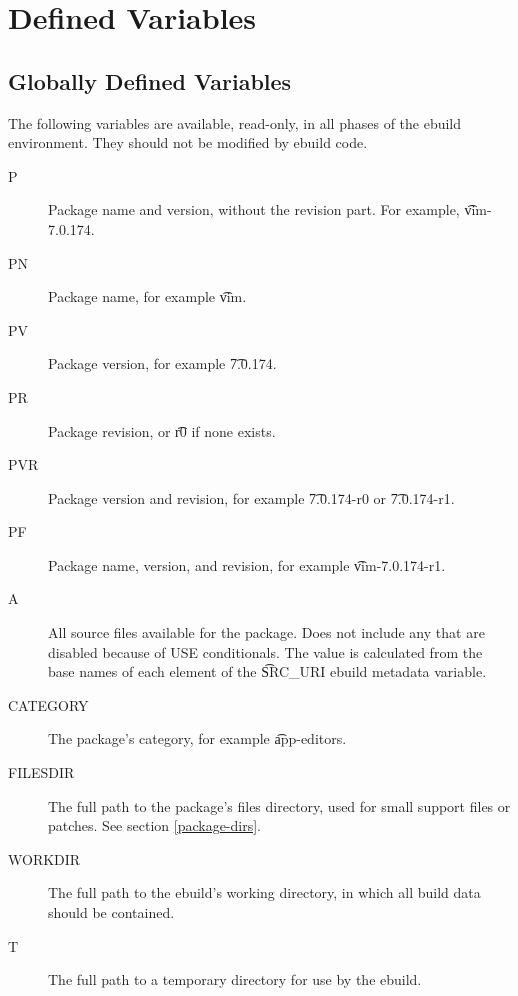 \section{Defined Variables}
\label{ebuild-env-vars}

\subsection{Globally Defined Variables}

The following variables are available, read-only, in all phases of the ebuild environment. They
should not be modified by ebuild code.
\begin{description}
\item[P] Package name and version, without the revision part. For example, \t{vim-7.0.174}.
\item[PN] Package name, for example \t{vim}.
\item[PV] Package version, for example \t{7.0.174}.
\item[PR] Package revision, or \t{r0} if none exists.
\item[PVR] Package version and revision, for example \t{7.0.174-r0} or \t{7.0.174-r1}.
\item[PF] Package name, version, and revision, for example \t{vim-7.0.174-r1}.
\item[A] All source files available for the package. Does not include any that are disabled because
    of USE conditionals. The value is calculated from the base names of each element of the
    \t{SRC\_URI} ebuild metadata variable.
\item[CATEGORY] The package's category, for example \t{app-editors}.
\item[FILESDIR] The full path to the package's files directory, used for small support files or
    patches. See section \ref{package-dirs}.
\item[WORKDIR] The full path to the ebuild's working directory, in which all build data should be
    contained.
\item[T] The full path to a temporary directory for use by the ebuild.
\end{description}



